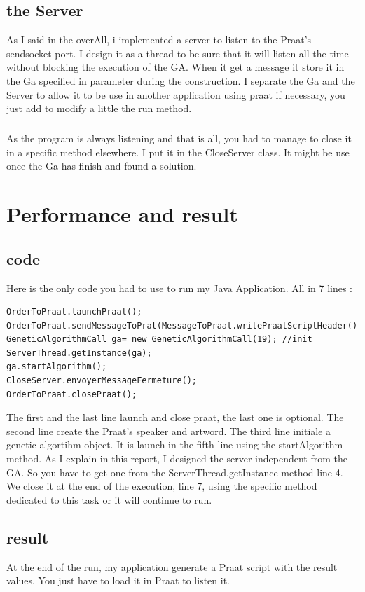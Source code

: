 \documentclass[12pt]{report}
\begin{document}
\section{the Server}
As I said in the overAll, i implemented a server to listen to the Praat's sendsocket port.
I design it as a thread to be sure that it will listen all the time without blocking the execution of the GA. When it get a message it store it in the Ga specified in parameter during the construction. I separate
the Ga and the Server to allow it to be use in another application using praat if necessary, you just add to modify a little the run method. 

\paragraph*{}
As the program is always listening and that is all, you had to manage to close it in a specific method elsewhere.
I put it in the CloseServer class. It might be use once the Ga has finish and found a solution.

\chapter{Performance and result}

\section{code}
Here is the only code you had to use to run my Java Application. All in 7 lines :

\begin{lstlisting}
OrderToPraat.launchPraat();
OrderToPraat.sendMessageToPrat(MessageToPraat.writePraatScriptHeader());
GeneticAlgorithmCall ga= new GeneticAlgorithmCall(19); //init
ServerThread.getInstance(ga);
ga.startAlgorithm();
CloseServer.envoyerMessageFermeture();
OrderToPraat.closePraat();
\end{lstlisting}

The first and the last line launch and close praat, the last one is optional.
The second line create the Praat's speaker and artword.
The third line initiale a genetic algortihm object. It is launch in the fifth line using the startAlgorithm method.
As I explain in this report, I designed the server independent from the GA. So you have to get one from the ServerThread.getInstance method line 4.
We close it at the end of the execution, line 7, using the specific method dedicated to this task or it will continue to run.

\section{result}
At the end of the run, my application generate a Praat script with the result values.
You just have to load it in Praat to listen it.

\listoffigures

 
\end{document}
